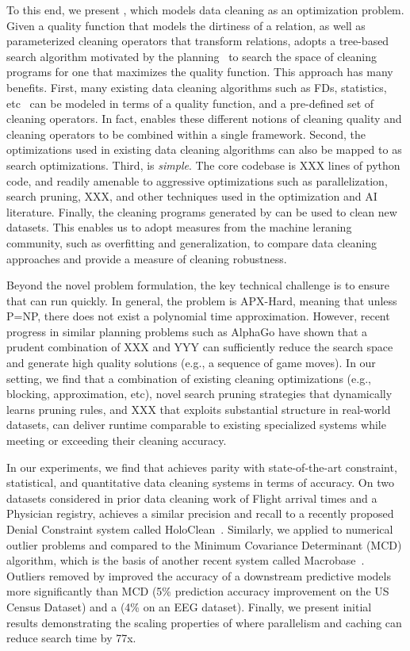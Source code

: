 To this end, we present \sys, which models data cleaning as an optimization problem.  
Given a quality function that models the dirtiness of a relation, as well as parameterized cleaning operators that transform relations, \sys adopts a tree-based search algorithm motivated by the planning~\cite{} to search the space of cleaning programs for one that maximizes the quality function.
This approach has many benefits.
First, many existing data cleaning algorithms such as FDs, statistics, etc~\cite{} can be modeled in terms of a quality function, and a pre-defined set of cleaning operators.
In fact, \sys enables these different notions of cleaning quality and cleaning operators to be combined within a single framework. 
Second, the optimizations used in existing data cleaning algorithms can also be mapped to \sys as search optimizations. 
Third, \sys is {\it simple}.  The core codebase is XXX lines of python code, and readily amenable to aggressive optimizations such as parallelization, search pruning, XXX, and other techniques used in the optimization and AI literature.
Finally, the cleaning programs generated by \sys can be used to clean new datasets.   This enables us to adopt measures from the machine leraning community, such as overfitting and generalization, to compare data cleaning approaches and provide a measure of cleaning robustness.

Beyond the novel problem formulation, the key technical challenge is to ensure that \sys can run quickly.  In general, the problem is APX-Hard, meaning that unless P=NP, there does not exist a polynomial time approximation.  However, recent progress in similar planning problems such as AlphaGo have shown that a prudent combination of XXX and YYY can sufficiently reduce the search space and generate high quality solutions (e.g., a sequence of game moves).   In our setting, we find that a combination of existing cleaning optimizations (e.g., blocking, approximation, etc), novel search pruning strategies that dynamically learns pruning rules, and XXX that exploits substantial structure in real-world datasets, can deliver runtime comparable to existing specialized systems while meeting or exceeding their cleaning accuracy.  

In our experiments, we find that \sys achieves parity with state-of-the-art constraint, statistical, and quantitative data cleaning systems in terms of accuracy.
On two datasets considered in prior data cleaning work of Flight arrival times and a Physician registry, \sys achieves a similar precision and recall to a recently proposed Denial Constraint system called HoloClean~\cite{rekatsinas2017holoclean}. 
Similarly, we applied \sys to numerical outlier problems and compared to the Minimum Covariance Determinant (MCD) algorithm, which is the basis of another recent system called Macrobase~\cite{bailis2016macrobase}.
Outliers removed by \sys  improved the accuracy of a downstream predictive models more significantly than MCD (5\% prediction accuracy improvement on the US Census Dataset) and a (4\% on an EEG dataset). 
Finally, we present initial results demonstrating the scaling properties of \sys where parallelism and caching can reduce search time by 77x.

